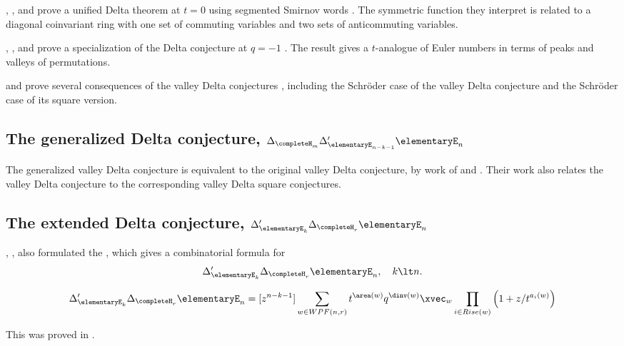 , , and
 prove a unified Delta theorem at $t=0$ using
segmented Smirnov words \cite{IraciNadeauWyngaerd2023x}.  The symmetric
function they interpret is related to a diagonal coinvariant ring with one set
of commuting variables and two sets of anticommuting variables.

, ,
and  prove a specialization of the Delta conjecture
at $q=-1$ \cite{CorteelJosuatVergesWyngaerd2024}.  The result gives a
$t$-analogue of Euler numbers in terms of peaks and valleys of permutations.

 and  prove several consequences
of the valley Delta conjectures \cite{DAdderioIraci2023}, including the
Schröder case of the valley Delta conjecture and the Schröder case of its
square version.


\subsection[dhGeneralizedDelta]{The generalized Delta conjecture,
$\Delta_{\completeH_m} \Delta'_{\elementaryE_{n-k-1}} \elementaryE_n$
}

The generalized valley Delta conjecture is equivalent to the original valley
Delta conjecture, by work of  and
 \cite{IraciWyngaerd2022}.  Their work also relates
the valley Delta conjecture to the corresponding valley Delta square
conjectures.

\subsection[dhExtendedDelta]{The extended Delta conjecture, $\Delta'_{\elementaryE_k} \Delta_{\completeH_r} \elementaryE_n$}

, , 
\cite{HaglundRemmelWilson2018}
also formulated the 
\label{extendedDeltaConjecture},
which gives a combinatorial formula for
\[
\Delta'_{\elementaryE_k} \Delta_{\completeH_r} \elementaryE_n, \quad k \lt n.
\]

\begin{theorem}
\[
\Delta'_{\elementaryE_k} \Delta_{\completeH_r} \elementaryE_n
= [z^{n-k-1}]
\sum_{w \in WPF(n,r)}
  t^{\area(w)}q^{\dinv(w)} \xvec_w
\prod_{i \in Rise(w)} \left(1 + z/t^{a_i(w)}\right)
\]
\end{theorem}
This was proved in \cite{BlasiakHaimanMorsePunSeelinger2023}.

